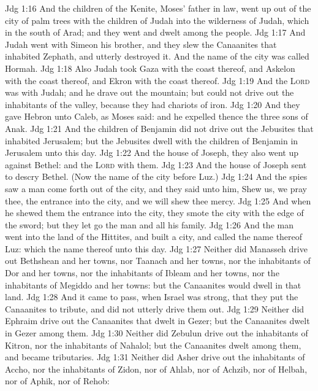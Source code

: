 \vs Jdg 1:16 And the children of the Kenite, Moses' father in law, went up out of the city of palm trees with the children of Judah into the wilderness of Judah, which  in the south of Arad; and they went and dwelt among the people.
\vs Jdg 1:17 And Judah went with Simeon his brother, and they slew the Canaanites that inhabited Zephath, and utterly destroyed it. And the name of the city was called Hormah.
\vs Jdg 1:18 Also Judah took Gaza with the coast thereof, and Askelon with the coast thereof, and Ekron with the coast thereof.
\vs Jdg 1:19 And the \textsc{Lord} was with Judah; and he drave out  the mountain; but could not drive out the inhabitants of the valley, because they had chariots of iron.
\vs Jdg 1:20 And they gave Hebron unto Caleb, as Moses said: and he expelled thence the three sons of Anak.
\vs Jdg 1:21 And the children of Benjamin did not drive out the Jebusites that inhabited Jerusalem; but the Jebusites dwell with the children of Benjamin in Jerusalem unto this day.
\vs Jdg 1:22 And the house of Joseph, they also went up against Bethel: and the \textsc{Lord}  with them.
\vs Jdg 1:23 And the house of Joseph sent to descry Bethel. (Now the name of the city before  Luz.)
\vs Jdg 1:24 And the spies saw a man come forth out of the city, and they said unto him, Shew us, we pray thee, the entrance into the city, and we will shew thee mercy.
\vs Jdg 1:25 And when he shewed them the entrance into the city, they smote the city with the edge of the sword; but they let go the man and all his family.
\vs Jdg 1:26 And the man went into the land of the Hittites, and built a city, and called the name thereof Luz: which  the name thereof unto this day.
\vs Jdg 1:27 Neither did Manasseh drive out  Bethshean and her towns, nor Taanach and her towns, nor the inhabitants of Dor and her towns, nor the inhabitants of Ibleam and her towns, nor the inhabitants of Megiddo and her towns: but the Canaanites would dwell in that land.
\vs Jdg 1:28 And it came to pass, when Israel was strong, that they put the Canaanites to tribute, and did not utterly drive them out.
\vs Jdg 1:29 Neither did Ephraim drive out the Canaanites that dwelt in Gezer; but the Canaanites dwelt in Gezer among them.
\vs Jdg 1:30 Neither did Zebulun drive out the inhabitants of Kitron, nor the inhabitants of Nahalol; but the Canaanites dwelt among them, and became tributaries.
\vs Jdg 1:31 Neither did Asher drive out the inhabitants of Accho, nor the inhabitants of Zidon, nor of Ahlab, nor of Achzib, nor of Helbah, nor of Aphik, nor of Rehob:
